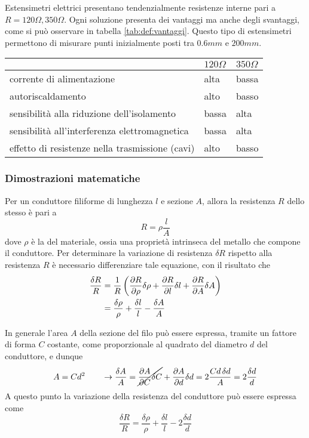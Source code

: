 		Estensimetri elettrici presentano tendenzialmente resistenze interne pari a $R=120\Omega,350\Omega$. Ogni soluzione presenta dei vantaggi ma anche degli svantaggi, come si può osservare in tabella \ref{tab:def:vantaggi}. Questo tipo di estensimetri permettono di misurare punti inizialmente posti tra $0.6mm$ e $200mm$.
		
		\begin{SCtable}[0.5][b!]
			\centering
			\begin{tabular}{p{5cm} p{1.2cm} p{1.2cm} }
				 &   $120\Omega$ &  $350\Omega$ \\ \hline
				 corrente di alimentazione &   alta &   bassa \\ \hline
				 autoriscaldamento &   alto &   basso \\ \hline
				 sensibilità alla riduzione dell'isolamento &   bassa &   alta \\ \hline
				 sensibilità all'interferenza elettromagnetica &   bassa &   alta \\ \hline
				 effetto di resistenze nella trasmissione (cavi) &   alto &   basso \\
			\end{tabular}
			\caption{vantaggi e svantaggi associati alle resistenze iniziale degli estensimetri elettrici.} \label{tab:def:vantaggi}
		\end{SCtable}
		
	\subsubsection{Dimostrazioni matematiche}
		Per un conduttore filiforme di lunghezza $l$ e sezione $A$, allora la resistenza $R$ dello stesso è pari a 
		\begin{equation}
			R= \rho \frac l A
		\end{equation}
		dove $\rho$ è la  del materiale, ossia una proprietà intrinseca del metallo che compone il conduttore. Per determinare la variazione di resistenza $\delta R$ rispetto alla resistenza $R$ è necessario differenziare tale equazione, con il risultato che
		\begin{align*}
			\frac{\delta R}{R} & = \frac 1 R \left( \frac{\partial R}{\partial \rho} \delta \rho + \frac{\partial R}{\partial l} \delta l + \frac{\partial R}{\partial A} \delta A \right) \\ 
			& = \frac{\delta \rho}{\rho} + \frac{\delta l}{l} - \frac{\delta A}{A}
		\end{align*}		
		
		In generale l'area $A$ della sezione del filo può essere espressa, tramite un fattore di forma $C$ costante, come proporzionale al quadrato del diametro $d$ del conduttore, e dunque
		\[ A = C d^2 \qquad \rightarrow \frac{\delta A}{A} = \cancel{\frac{\partial A}{\partial C}\delta C}+ \frac{\partial A}{\partial d} \delta d = 2\frac{Cd \, \delta d}{A} = 2\frac{\delta d}{d}\]
		A questo punto la variazione della resistenza del conduttore può essere espressa come 
		\[ \frac{\delta R}{R} =  \frac{\delta \rho}{\rho} + \frac{\delta l}{l} - 2\frac{\delta d}{d} \]
		
